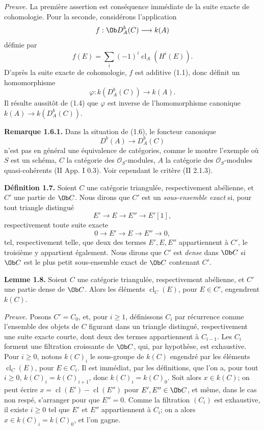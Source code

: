 \documentclass[11pt]{article}
\newcommand{\cl}{\operatorname{cl}}
\begin{document}
\emph{Preuve.} La première assertion est conséquence immédiate de la suite exacte de cohomologie. Pour la seconde, considérons l'application
\[
 f:\Ob D_A^b(C)\longrightarrow k(A)
\]
définie par
\[
 f(E)=\sum_i(-1)^i\cl_A(H^i(E)).
\]
D'après la suite exacte de cohomologie, \(f\) est additive (1.1), donc définit un homomorphisme
\[
 \varphi:k(D_A^b(C))\longrightarrow k(A).
\]
Il résulte aussitôt de (1.4) que \(\varphi\) est inverse de l'homomorphisme canonique \(k(A)\to k(D_A^b(C))\).

\textbf{Remarque 1.6.1.} Dans la situation de (1.6), le foncteur canonique
\[
 D^b(A)\longrightarrow D_A^b(C)
\]
n'est pas en général une équivalence de catégories, comme le montre l'exemple où \(S\) est un schéma, \(C\) la catégorie des \(\mathcal O_S\)-modules, \(A\) la catégorie des \(\mathcal O_S\)-modules quasi-cohérents (II App. I 0.3). Voir cependant le critère (II 2.1.3).

\textbf{Définition 1.7.} Soient \(C\) une catégorie triangulée, respectivement abélienne, et \(C'\) une partie de \(\Ob C\). Nous dirons que \(C'\) est un \emph{sous-ensemble exact} si, pour tout triangle distingué
\[
 E'\longrightarrow E\longrightarrow E''\longrightarrow E'[1],
\]
respectivement toute suite exacte
\[
 0\longrightarrow E'\longrightarrow E\longrightarrow E''\longrightarrow0,
\]
tel, respectivement telle, que deux des termes \(E',E,E''\) appartiennent à \(C'\), le troisième y appartient également. Nous dirons que \(C'\) est \emph{dense} dans \(\Ob C\) si \(\Ob C\) est le plus petit sous-ensemble exact de \(\Ob C\) contenant \(C'\).

\textbf{Lemme 1.8.} Soient \(C\) une catégorie triangulée, respectivement abélienne, et \(C'\) une partie dense de \(\Ob C\). Alors les éléments \(\cl_C(E)\), pour \(E\in C'\), engendrent \(k(C)\).

\emph{Preuve.} Posons \(C'=C_0\), et, pour \(i\geq1\), définissons \(C_i\) par récurrence comme l'ensemble des objets de \(C\) figurant dans un triangle distingué, respectivement une suite exacte courte, dont deux des termes appartiennent à \(C_{i-1}\). Les \(C_i\) forment une filtration croissante de \(\Ob C\), qui, par hypothèse, est exhaustive. Pour \(i\geq0\), notons \(k(C)_i\) le sous-groupe de \(k(C)\) engendré par les éléments \(\cl_C(E)\), pour \(E\in C_i\). Il est immédiat, par les définitions, que l'on a, pour tout \(i\geq0\), \(k(C)_i=k(C)_{i+1}\), donc \(k(C)_i=k(C)_0\). Soit alors \(x\in k(C)\); on peut écrire \(x=\cl(E')-\cl(E'')\) pour \(E',E''\in\Ob C\), et même, dans le cas non respé, s'arranger pour que \(E''=0\). Comme la filtration \((C_i)\) est exhaustive, il existe \(i\geq0\) tel que \(E'\) et \(E''\) appartiennent à \(C_i\); on a alors \(x\in k(C)_i=k(C)_0\), et l'on gagne.
\end{document}
